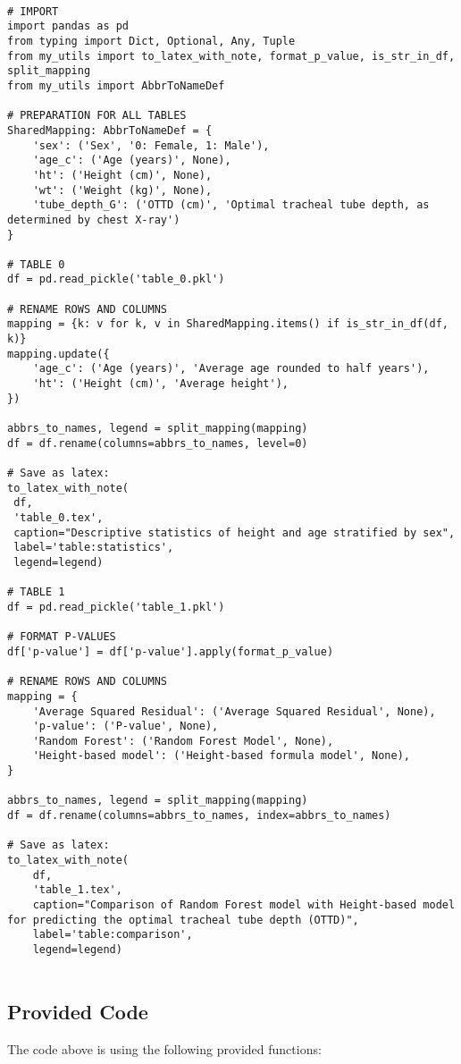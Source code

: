 \documentclass[11pt]{article}
\begin{document}
\begin{verbatim}

# IMPORT
import pandas as pd
from typing import Dict, Optional, Any, Tuple
from my_utils import to_latex_with_note, format_p_value, is_str_in_df, split_mapping
from my_utils import AbbrToNameDef

# PREPARATION FOR ALL TABLES
SharedMapping: AbbrToNameDef = {
    'sex': ('Sex', '0: Female, 1: Male'),
    'age_c': ('Age (years)', None),
    'ht': ('Height (cm)', None),
    'wt': ('Weight (kg)', None),
    'tube_depth_G': ('OTTD (cm)', 'Optimal tracheal tube depth, as determined by chest X-ray')
}

# TABLE 0
df = pd.read_pickle('table_0.pkl')

# RENAME ROWS AND COLUMNS
mapping = {k: v for k, v in SharedMapping.items() if is_str_in_df(df, k)}
mapping.update({
    'age_c': ('Age (years)', 'Average age rounded to half years'),
    'ht': ('Height (cm)', 'Average height'),
})

abbrs_to_names, legend = split_mapping(mapping)
df = df.rename(columns=abbrs_to_names, level=0)

# Save as latex:
to_latex_with_note(
 df, 
 'table_0.tex', 
 caption="Descriptive statistics of height and age stratified by sex", 
 label='table:statistics',
 legend=legend)

# TABLE 1
df = pd.read_pickle('table_1.pkl')

# FORMAT P-VALUES
df['p-value'] = df['p-value'].apply(format_p_value)

# RENAME ROWS AND COLUMNS
mapping = {
    'Average Squared Residual': ('Average Squared Residual', None),
    'p-value': ('P-value', None),
    'Random Forest': ('Random Forest Model', None),
    'Height-based model': ('Height-based formula model', None),
}

abbrs_to_names, legend = split_mapping(mapping)
df = df.rename(columns=abbrs_to_names, index=abbrs_to_names)

# Save as latex:
to_latex_with_note(
    df, 
    'table_1.tex', 
    caption="Comparison of Random Forest model with Height-based model for predicting the optimal tracheal tube depth (OTTD)", 
    label='table:comparison',
    legend=legend)


\end{verbatim}

\subsection{Provided Code}
The code above is using the following provided functions:
\end{document}
